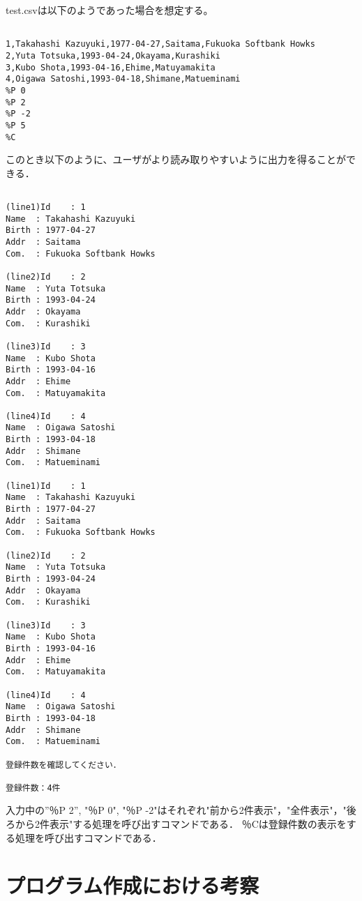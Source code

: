 \documentclass[a4j]{jarticle}
\begin{document}
test.csvは以下のようであった場合を想定する。

{\baselineskip 3mm
\begin{verbatim}

1,Takahashi Kazuyuki,1977-04-27,Saitama,Fukuoka Softbank Howks
2,Yuta Totsuka,1993-04-24,Okayama,Kurashiki
3,Kubo Shota,1993-04-16,Ehime,Matuyamakita
4,Oigawa Satoshi,1993-04-18,Shimane,Matueminami
%P 0
%P 2
%P -2
%P 5
%C
\end{verbatim}
}

このとき以下のように、ユーザがより読み取りやすいように出力を得ることができる．

{\baselineskip 3mm
\begin{verbatim}

(line1)Id    : 1
Name  : Takahashi Kazuyuki
Birth : 1977-04-27
Addr  : Saitama
Com.  : Fukuoka Softbank Howks

(line2)Id    : 2
Name  : Yuta Totsuka
Birth : 1993-04-24
Addr  : Okayama
Com.  : Kurashiki

(line3)Id    : 3
Name  : Kubo Shota
Birth : 1993-04-16
Addr  : Ehime
Com.  : Matuyamakita

(line4)Id    : 4
Name  : Oigawa Satoshi
Birth : 1993-04-18
Addr  : Shimane
Com.  : Matueminami

(line1)Id    : 1
Name  : Takahashi Kazuyuki
Birth : 1977-04-27
Addr  : Saitama
Com.  : Fukuoka Softbank Howks

(line2)Id    : 2
Name  : Yuta Totsuka
Birth : 1993-04-24
Addr  : Okayama
Com.  : Kurashiki

(line3)Id    : 3
Name  : Kubo Shota
Birth : 1993-04-16
Addr  : Ehime
Com.  : Matuyamakita

(line4)Id    : 4
Name  : Oigawa Satoshi
Birth : 1993-04-18
Addr  : Shimane
Com.  : Matueminami

登録件数を確認してください．

登録件数：4件

\end{verbatim}
}

入力中の”％P 2”, "％P 0", "％P -2"はそれぞれ"前から2件表示"，"全件表示"，"後ろから2件表示"する処理を呼び出すコマンドである．
％Cは登録件数の表示をする処理を呼び出すコマンドである．

%
%

\section{プログラム作成における考察}
\end{document}
